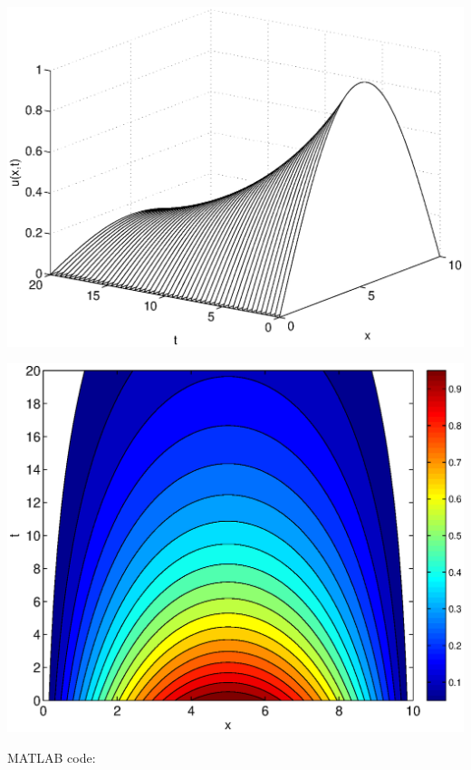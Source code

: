 \begin{solution}
\begin{enumerate}
\begin{center}
           \includegraphics[scale=0.53]{checksol4}

           \includegraphics[scale=0.53]{checksol5}
      \end{center}

MATLAB code:



\end{enumerate}
\end{solution}

